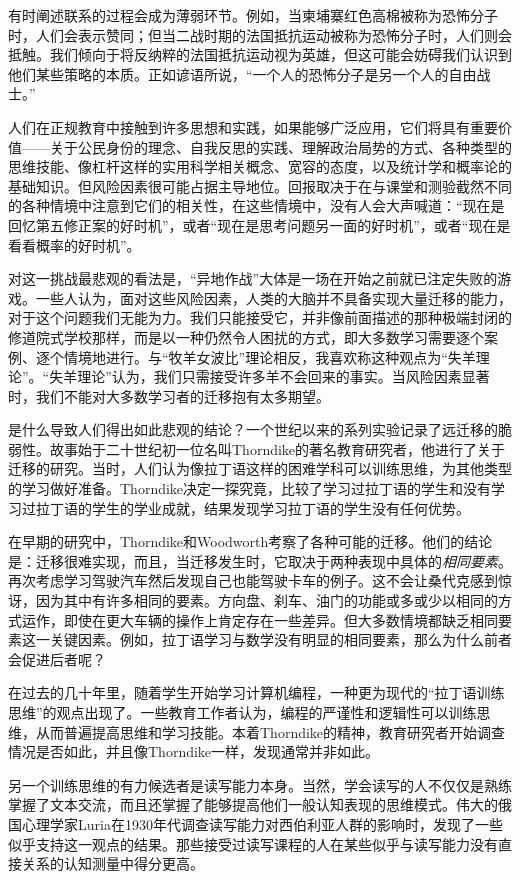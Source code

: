 有时阐述联系的过程会成为薄弱环节。例如，当柬埔寨红色高棉被称为恐怖分子时，人们会表示赞同；但当二战时期的法国抵抗运动被称为恐怖分子时，人们则会抵触。我们倾向于将反纳粹的法国抵抗运动视为英雄，但这可能会妨碍我们认识到他们某些策略的本质。正如谚语所说，“一个人的恐怖分子是另一个人的自由战士。”

人们在正规教育中接触到许多思想和实践，如果能够广泛应用，它们将具有重要价值——关于公民身份的理念、自我反思的实践、理解政治局势的方式、各种类型的思维技能、像杠杆这样的实用科学相关概念、宽容的态度，以及统计学和概率论的基础知识。但风险因素很可能占据主导地位。回报取决于在与课堂和测验截然不同的各种情境中注意到它们的相关性，在这些情境中，没有人会大声喊道：“现在是回忆第五修正案的好时机”，或者“现在是思考问题另一面的好时机”，或者“现在是看看概率的好时机”。

对这一挑战最悲观的看法是，“异地作战”大体是一场在开始之前就已注定失败的游戏。一些人认为，面对这些风险因素，人类的大脑并不具备实现大量迁移的能力，对于这个问题我们无能为力。我们只能接受它，并非像前面描述的那种极端封闭的修道院式学校那样，而是以一种仍然令人困扰的方式，即大多数学习需要逐个案例、逐个情境地进行。与“牧羊女波比”理论相反，我喜欢称这种观点为“失羊理论”。“失羊理论”认为，我们只需接受许多羊不会回来的事实。当风险因素显著时，我们不能对大多数学习者的迁移抱有太多期望。

是什么导致人们得出如此悲观的结论？一个世纪以来的系列实验记录了远迁移的脆弱性。故事始于二十世纪初一位名叫Thorndike的著名教育研究者，他进行了关于迁移的研究。当时，人们认为像拉丁语这样的困难学科可以训练思维，为其他类型的学习做好准备。Thorndike决定一探究竟，比较了学习过拉丁语的学生和没有学习过拉丁语的学生的学业成就，结果发现学习拉丁语的学生没有任何优势。

在早期的研究中，Thorndike和Woodworth考察了各种可能的迁移。他们的结论是：迁移很难实现，而且，当迁移发生时，它取决于两种表现中具体的\textit{相同要素}。再次考虑学习驾驶汽车然后发现自己也能驾驶卡车的例子。这不会让桑代克感到惊讶，因为其中有许多相同的要素。方向盘、刹车、油门的功能或多或少以相同的方式运作，即使在更大车辆的操作上肯定存在一些差异。但大多数情境都缺乏相同要素这一关键因素。例如，拉丁语学习与数学没有明显的相同要素，那么为什么前者会促进后者呢？

在过去的几十年里，随着学生开始学习计算机编程，一种更为现代的“拉丁语训练思维”的观点出现了。一些教育工作者认为，编程的严谨性和逻辑性可以训练思维，从而普遍提高思维和学习技能。本着Thorndike的精神，教育研究者开始调查情况是否如此，并且像Thorndike一样，发现通常并非如此。

另一个训练思维的有力候选者是读写能力本身。当然，学会读写的人不仅仅是熟练掌握了文本交流，而且还掌握了能够提高他们一般认知表现的思维模式。伟大的俄国心理学家Luria在1930年代调查读写能力对西伯利亚人群的影响时，发现了一些似乎支持这一观点的结果。那些接受过读写课程的人在某些似乎与读写能力没有直接关系的认知测量中得分更高。

